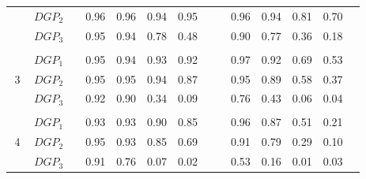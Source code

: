 \begin{table}[htbp]
{\begin{tabular}{cc|ccccccc|cccccc|}
    \multicolumn{2}{c|}{} & \multicolumn{1}{l}{$DGP_{2}$} & & \multicolumn{1}{c}{0.96} & \multicolumn{1}{c}{0.96} & \multicolumn{1}{c}{0.94} & \multicolumn{1}{c}{0.95} & & & \multicolumn{1}{c}{0.96} & \multicolumn{1}{c}{0.94} & \multicolumn{1}{c}{0.81} & \multicolumn{1}{c}{0.70} & \\
    \multicolumn{2}{c|}{} & \multicolumn{1}{l}{$DGP_{3}$} & & \multicolumn{1}{c}{0.95} & \multicolumn{1}{c}{0.94} & \multicolumn{1}{c}{0.78} & \multicolumn{1}{c}{0.48} & & & \multicolumn{1}{c}{0.90} & \multicolumn{1}{c}{0.77} & \multicolumn{1}{c}{0.36} & \multicolumn{1}{c}{0.18} & \\
    & & & & & & & & & & & & & & \\
    \multicolumn{2}{c|}{\multirow{3}{*}{3}} & \multicolumn{1}{l}{$DGP_{1}$} & & \multicolumn{1}{c}{0.95} & \multicolumn{1}{c}{0.94} & \multicolumn{1}{c}{0.93} & \multicolumn{1}{c}{0.92} & & & \multicolumn{1}{c}{0.97} & \multicolumn{1}{c}{0.92} & \multicolumn{1}{c}{0.69} & \multicolumn{1}{c}{0.53} & \\
    \multicolumn{2}{c|}{} & \multicolumn{1}{l}{$DGP_{2}$} & & \multicolumn{1}{c}{0.95} & \multicolumn{1}{c}{0.95} & \multicolumn{1}{c}{0.94} & \multicolumn{1}{c}{0.87} & & & \multicolumn{1}{c}{0.95} & \multicolumn{1}{c}{0.89} & \multicolumn{1}{c}{0.58} & \multicolumn{1}{c}{0.37} & \\
    \multicolumn{2}{c|}{} & \multicolumn{1}{l}{$DGP_{3}$} & & \multicolumn{1}{c}{0.92} & \multicolumn{1}{c}{0.90} & \multicolumn{1}{c}{0.34} & \multicolumn{1}{c}{0.09} & & & \multicolumn{1}{c}{0.76} & \multicolumn{1}{c}{0.43} & \multicolumn{1}{c}{0.06} & \multicolumn{1}{c}{0.04} & \\
    & & & & & & & & & & & & & & \\
    \multicolumn{2}{c|}{\multirow{3}{*}{4}} & \multicolumn{1}{l}{$DGP_{1}$} & & \multicolumn{1}{c}{0.93} & \multicolumn{1}{c}{0.93} & \multicolumn{1}{c}{0.90} & \multicolumn{1}{c}{0.85} & & & \multicolumn{1}{c}{0.96} & \multicolumn{1}{c}{0.87} & \multicolumn{1}{c}{0.51} & \multicolumn{1}{c}{0.21} & \\
    \multicolumn{2}{c|}{} & \multicolumn{1}{l}{$DGP_{2}$} & & \multicolumn{1}{c}{0.95} & \multicolumn{1}{c}{0.93} & \multicolumn{1}{c}{0.85} & \multicolumn{1}{c}{0.69} & & & \multicolumn{1}{c}{0.91} & \multicolumn{1}{c}{0.79} & \multicolumn{1}{c}{0.29} & \multicolumn{1}{c}{0.10} & \\
    \multicolumn{2}{c|}{} & \multicolumn{1}{l}{$DGP_{3}$} & & \multicolumn{1}{c}{0.91} & \multicolumn{1}{c}{0.76} & \multicolumn{1}{c}{0.07} & \multicolumn{1}{c}{0.02} & & & \multicolumn{1}{c}{0.53} & \multicolumn{1}{c}{0.16} & \multicolumn{1}{c}{0.01} & \multicolumn{1}{c}{0.03} & \\

\end{tabular}}
\end{table}
